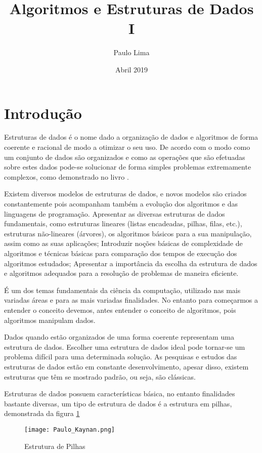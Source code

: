 \documentclass[10pt]{article}
\title{Algoritmos e Estruturas de Dados I}
\author{Paulo Lima}
\date{Abril 2019}
\begin{document}
\maketitle
\newpage
\section{Introdução}
Estruturas de dados é o nome dado a organização de dados e algoritmos de forma coerente e racional de modo a otimizar o seu uso. De acordo com o modo como um conjunto de dados são organizados e como as operações que são efetuadas sobre estes dados pode-se solucionar de forma simples problemas extremamente complexos, como demonstrado no livro \cite{Estrutura}.

Existem diversos modelos de estruturas de dados, e novos modelos são criados constantemente pois acompanham também a evolução dos algoritmos e das linguagens de programação. Apresentar as diversas estruturas de dados fundamentais, como estruturas lineares (listas encadeadas, pilhas, filas, etc.), estruturas não-lineares (árvores), os algoritmos básicos para a sua manipulação, assim como as suas aplicações; Introduzir noções básicas de complexidade de algoritmos e técnicas básicas para comparação dos tempos de execução dos algoritmos estudados; Apresentar a importância da escolha da estrutura de dados e algoritmos adequados para a resolução de problemas de maneira eficiente.

É um dos temas fundamentais da ciência da computação, utilizado nas mais variadas áreas e para as mais variadas finalidades. No entanto para começarmos a entender o conceito devemos, antes entender o conceito de algoritmos, pois algoritmos manipulam dados.

Dados quando estão organizados de uma forma coerente representam uma estrutura de dados. Escolher uma estrutura de dados ideal pode tornar-se um problema difícil para uma determinada solução. As pesquisas e estudos das estruturas de dados estão em constante desenvolvimento, apesar disso, existem estruturas que têm se mostrado padrão, ou seja, são clássicas.

Estruturas de dados possuem características básica, no entanto finalidades bastante diversas, um tipo de estrutura de dados é a estrutura em pilhas, demonstrada da figura \ref{imagem}
\begin{figure}[h!]
    \centering
    \texttt{[image: Paulo\_Kaynan.png]}
    \caption{Estrutura de Pilhas}
    \label{imagem}
\end{figure}
\newpage
\end{document}
